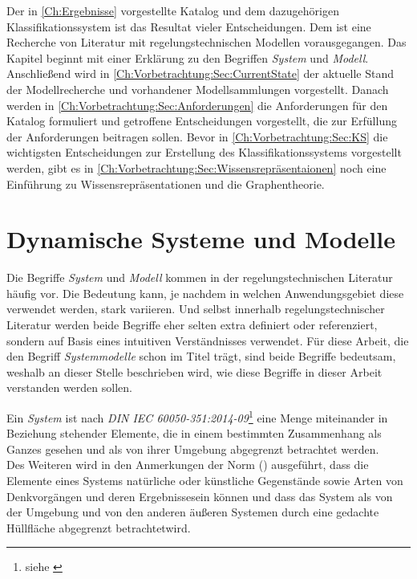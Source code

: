 Der in \autoref{Ch:Ergebnisse} vorgestellte Katalog und dem dazugehörigen Klassifikationssystem ist das Resultat vieler Entscheidungen. Dem ist eine Recherche von Literatur mit regelungstechnischen Modellen vorausgegangen. Das Kapitel beginnt mit einer Erklärung zu den Begriffen \textit{System} und \textit{Modell}. Anschließend wird in \autoref{Ch:Vorbetrachtung:Sec:CurrentState} der aktuelle Stand der Modellrecherche und vorhandener Modellsammlungen vorgestellt. Danach werden in \autoref{Ch:Vorbetrachtung:Sec:Anforderungen} die Anforderungen für den Katalog formuliert und getroffene Entscheidungen vorgestellt, die zur Erfüllung der Anforderungen beitragen sollen. Bevor in \ref{Ch:Vorbetrachtung:Sec:KS} die wichtigsten Entscheidungen zur Erstellung des Klassifikationssystems vorgestellt werden, gibt es in \autoref{Ch:Vorbetrachtung:Sec:Wissensrepräsentaionen} noch eine Einführung zu Wissensrepräsentationen und die Graphentheorie.   

\section{Dynamische Systeme und Modelle}
\label{Ch:Vorbetrachtung:Sec:SystemeModelle}
Die Begriffe \textit{System} und \textit{Modell} kommen in der regelungstechnischen Literatur häufig vor. Die Bedeutung kann, je nachdem in welchen Anwendungsgebiet diese verwendet werden, stark variieren. Und selbst innerhalb regelungstechnischer Literatur werden beide Begriffe eher selten extra definiert oder referenziert, sondern auf Basis eines intuitiven Verständnisses verwendet. Für diese Arbeit, die den Begriff \textit{Systemmodelle} schon im Titel trägt, sind beide Begriffe bedeutsam, weshalb an dieser Stelle beschrieben wird, wie diese Begriffe in dieser Arbeit verstanden werden sollen.

Ein \textit{System} ist nach \textit{DIN IEC 60050-351:2014-09}\footnote{siehe \cite[S. 21]{DINIEC60050-351} } eine \glqq Menge miteinander in Beziehung stehender Elemente, die in einem bestimmten Zusammenhang als Ganzes gesehen und als von ihrer Umgebung abgegrenzt betrachtet werden\grqq.\\
Des Weiteren wird in den Anmerkungen der Norm (\cite[S. 21]{DINIEC60050-351}) ausgeführt, dass die Elemente eines Systems \glqq natürliche oder künstliche Gegenstände sowie Arten von Denkvorgängen und deren Ergebnisse\grqq sein können und dass das System \glqq als von der Umgebung und von den anderen äußeren Systemen durch eine gedachte Hüllfläche abgegrenzt betrachtet\grqq wird.

